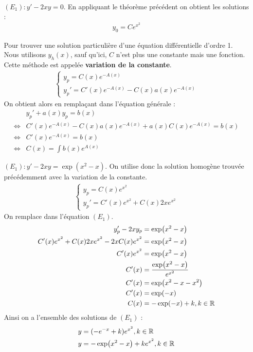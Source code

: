\begin{example}
    $(E_1) : y' - 2xy = 0$.
    En appliquant le théorème précédent on obtient les solutions :
    \begin{align*}
        y_0 = Ce^{x^2}
    \end{align*}
\end{example}

Pour trouver une solution particulière d'une équation différentielle d'ordre 1. Nous utilisons $y_{h}(x)$, sauf qu'ici, $C$ n'est plus une constante mais une fonction. Cette méthode est appelée \textbf{variation de la constante}.
    \begin{align*}
        \begin{cases}
            y_{p} = C(x)e^{-A(x)} \\
            y_{p}' = C'(x)e^{-A(x)} - C(x)a(x)e^{-A(x)}
        \end{cases}
    \end{align*}
    On obtient alors en remplaçant dans l'équation générale :
    \begin{align*}
        &y_{p}' + a(x) y_{p} = b(x) \\
        \iff &C'(x)e^{-A(x)} - C(x)a(x) e^{-A(x)} + a(x)C(x)e^{-A(x)} = b(x) \\
        \iff &C'(x) e^{-A(x)} = b(x) \\
        \iff &C(x) = \int b(x) e^{A(x)}
    \end{align*}

\begin{example}
    $(E_1) : y' - 2xy = \exp(x^2 - x)$.
    On utilise donc la solution homogène trouvée précédemment avec la variation de la constante.
    \begin{align*}
        \begin{cases}
            y_p = C(x) e^{x^2} \\ 
            y_p' = C'(x) e^{x^2} + C(x)2x e^{x^2}
        \end{cases}
    \end{align*}
    On remplace dans l'équation $(E_1)$.
    \begin{align*}
        y_p' - 2x y_p &= \exp(x^2 - x) \\
        C'(x) e^{x^2} + C(x)2x e^{x^2} - 2x C(x)e^{x^2} &= \exp(x^2 - x) \\
        C'(x)e^{x^2} &= \exp(x^2 - x) \\ 
        C'(x) &= \frac{\exp(x^2 - x)}{e^{x^2}} \\
        C'(x) &= \exp(x^2 - x - x^2) \\
        C'(x) &= \exp(-x) \\
        C(x) &= -\exp(-x) + k, k \in \mathbb{R}
    \end{align*}
    Ainsi on a l'ensemble des solutions de $(E_1)$ :
    \begin{align*}
        y &= (-e^{-x} + k) e^{x^2}, k \in \mathbb{R} \\
        y &= -\exp(x^2 - x) + ke^{x^2}, k \in \mathbb{R}
    \end{align*}
\end{example}

